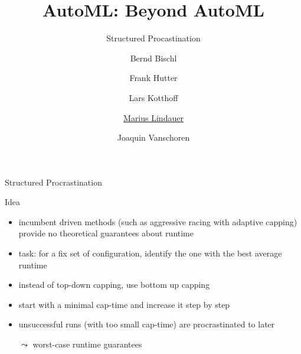 


\title[AutoML: Capping]{AutoML: Beyond AutoML}
\subtitle{Structured Procastination}
\author[Marius Lindauer]{Bernd Bischl \and Frank Hutter \and Lars Kotthoff\newline \and \underline{Marius Lindauer} \and Joaquin Vanschoren}
\institute{}
\date{}



	
	\maketitle


\begin{frame}[c,fragile]{Structured Procrastination }

\begin{block}{Idea}
	\begin{itemize}
		\item incumbent driven methods (such as aggressive racing with adaptive capping) provide no theoretical guarantees about runtime
		\pause
		\item task: for a fix set of configuration, identify the one with the best average runtime
		
		\item instead of top-down capping, use bottom up capping
		\pause
		\item start with a minimal cap-time and increase it step by step
		\pause
		\item unsuccessful runs (with too small cap-time) are procrastinated to later
		\item[$\leadsto$] worst-case runtime guarantees
	\end{itemize}
\end{block}

\end{frame}

